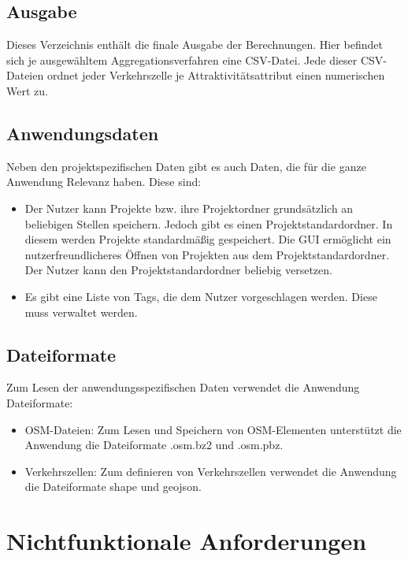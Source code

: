 \documentclass[parskip=full]{scrartcl} %
\begin{document}
\subsection*{Ausgabe} \hypertarget{finalresult}{}
Dieses Verzeichnis enthält die finale Ausgabe der Berechnungen. Hier befindet sich je ausgewähltem Aggregationsverfahren eine CSV-Datei. Jede dieser CSV-Dateien ordnet jeder Verkehrszelle je Attraktivitätsattribut einen numerischen Wert zu.


\subsection*{Anwendungsdaten}
Neben den projektspezifischen Daten gibt es auch Daten, die für die ganze Anwendung Relevanz haben. Diese sind:
\begin{itemize}
    \item Der Nutzer kann Projekte bzw. ihre Projektordner grundsätzlich an beliebigen Stellen speichern. Jedoch gibt es einen Projektstandardordner. In diesem werden Projekte standardmäßig gespeichert. Die GUI ermöglicht ein nutzerfreundlicheres Öffnen von Projekten aus dem Projektstandardordner. Der Nutzer kann den Projektstandardordner beliebig versetzen.
    \item Es gibt eine Liste von Tags, die dem Nutzer vorgeschlagen werden. Diese muss verwaltet werden.
\end{itemize}


\subsection*{Dateiformate} \hypertarget{dataformat}{}
Zum Lesen der anwendungsspezifischen Daten verwendet die Anwendung Dateiformate:
\begin{itemize}
    \item OSM-Dateien: Zum Lesen und Speichern von OSM-Elementen unterstützt die Anwendung die Dateiformate .osm.bz2 und .osm.pbz.
    \item Verkehrszellen: Zum definieren von Verkehrszellen verwendet die Anwendung die Dateiformate shape und geojson.
\end{itemize}


\newpage







\section{Nichtfunktionale Anforderungen}
\end{document}
